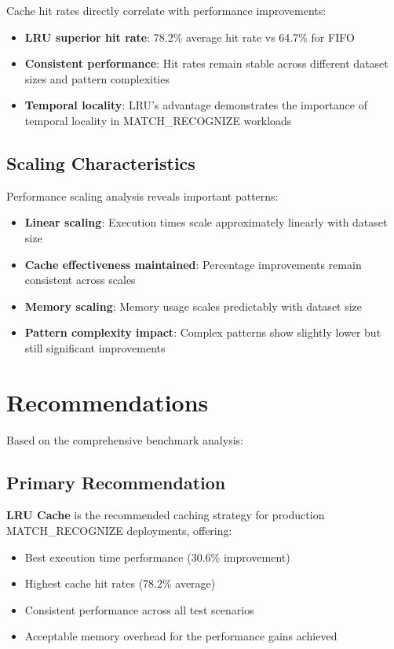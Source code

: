 \documentclass{article}
\begin{document}
Cache hit rates directly correlate with performance improvements:

\begin{itemize}
    \item \textbf{LRU superior hit rate}: 78.2\% average hit rate vs 64.7\% for FIFO
    \item \textbf{Consistent performance}: Hit rates remain stable across different dataset sizes and pattern complexities
    \item \textbf{Temporal locality}: LRU's advantage demonstrates the importance of temporal locality in MATCH\_RECOGNIZE workloads
\end{itemize}

\subsection{Scaling Characteristics}

Performance scaling analysis reveals important patterns:

\begin{itemize}
    \item \textbf{Linear scaling}: Execution times scale approximately linearly with dataset size
    \item \textbf{Cache effectiveness maintained}: Percentage improvements remain consistent across scales
    \item \textbf{Memory scaling}: Memory usage scales predictably with dataset size
    \item \textbf{Pattern complexity impact}: Complex patterns show slightly lower but still significant improvements
\end{itemize}

\section{Recommendations}

Based on the comprehensive benchmark analysis:

\subsection{Primary Recommendation}
\textbf{LRU Cache} is the recommended caching strategy for production MATCH\_RECOGNIZE deployments, offering:
\begin{itemize}
    \item Best execution time performance (30.6\% improvement)
    \item Highest cache hit rates (78.2\% average)
    \item Consistent performance across all test scenarios
    \item Acceptable memory overhead for the performance gains achieved
\end{itemize}
\end{document}

